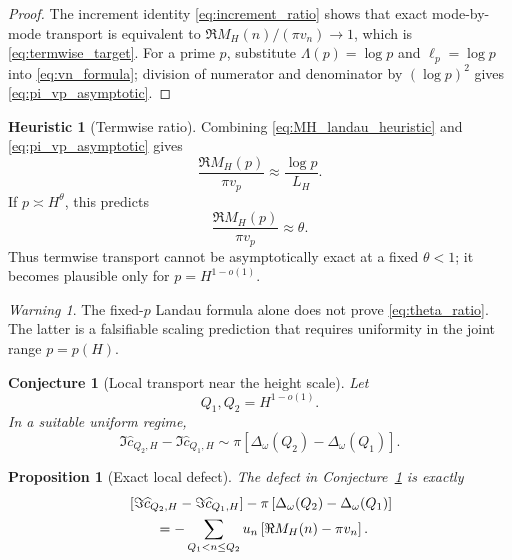 \documentclass[11pt]{amsart}
\numberwithin{equation}{section}
\theoremstyle{plain}
\newtheorem{proposition}[theorem]{Proposition}
\newtheorem{conjecture}[theorem]{Conjecture}
\theoremstyle{definition}
\newtheorem{heuristic}[theorem]{Heuristic}
\theoremstyle{remark}
\newtheorem{warning}[theorem]{Warning}
\newcommand{\1}{\mathbf{1}}
\begin{document}
\begin{proof}
The increment identity \eqref{eq:increment_ratio} shows that exact
mode-by-mode transport is equivalent to
\(\Re M_H(n)/(\pi v_n)\to1\), which is
\eqref{eq:termwise_target}.  For a prime \(p\), substitute
\(\Lambda(p)=\log p\) and \(\ell_p=\log p\) into
\eqref{eq:vn_formula}; division of numerator and denominator by
\((\log p)^2\) gives \eqref{eq:pi_vp_asymptotic}.
\end{proof}

\begin{heuristic}[Termwise ratio]
\label{heur:termwise_ratio}
Combining \eqref{eq:MH_landau_heuristic} and
\eqref{eq:pi_vp_asymptotic} gives
\begin{equation}
\frac{\Re M_H(p)}{\pi v_p}
\approx
\frac{\log p}{L_H}.
\label{eq:termwise_ratio}
\end{equation}
If \(p\asymp H^\theta\), this predicts
\begin{equation}
\frac{\Re M_H(p)}{\pi v_p}
\approx\theta.
\label{eq:theta_ratio}
\end{equation}
Thus termwise transport cannot be asymptotically exact at a fixed
\(\theta<1\); it becomes plausible only for
\(p=H^{1-o(1)}\).
\end{heuristic}

\begin{warning}
\label{warn:uniform_landau}
The fixed-\(p\) Landau formula alone does not prove
\eqref{eq:theta_ratio}.  The latter is a falsifiable scaling prediction
that requires uniformity in the joint range \(p=p(H)\).
\end{warning}

\begin{conjecture}[Local transport near the height scale]
\label{conj:local_transport}
Let
\begin{equation}
Q_1,Q_2=H^{1-o(1)}.
\label{eq:local_Q_range}
\end{equation}
In a suitable uniform regime,
\begin{equation}
\Im\widehat c_{Q_2,H}-\Im\widehat c_{Q_1,H}
\sim
\pi\left[
\Delta_\omega(Q_2)-\Delta_\omega(Q_1)
\right].
\label{eq:local_transport_conjecture}
\end{equation}
\end{conjecture}

\begin{proposition}[Exact local defect]
\label{prop:local_defect}
The defect in Conjecture~\ref{conj:local_transport} is exactly
\begin{align}
&
\left[
\Im\widehat c_{Q_2,H}-\Im\widehat c_{Q_1,H}
\right]
-
\pi\left[
\Delta_\omega(Q_2)-\Delta_\omega(Q_1)
\right]
\notag
\\
&\qquad
=
-\sum_{Q_1<n\leq Q_2}
u_n\left[
\Re M_H(n)-\pi v_n
\right].
\label{eq:local_defect_identity}
\end{align}
\end{proposition}
\end{document}
